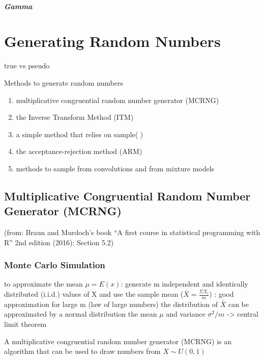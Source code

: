 \documentclass[
  letterpaper,
  DIV=11,
  numbers=noendperiod]{scrreprt}
\providecommand{\tightlist}{%
  \setlength{\itemsep}{0pt}\setlength{\parskip}{0pt}}\usepackage{longtable,booktabs,array}
\begin{document}
\subsubsection{Gamma}\label{gamma}

\part{Generating Random Numbers}

true vs pseudo

Methods to generate random numbers

\begin{enumerate}
\def\labelenumi{\arabic{enumi}.}
\tightlist
\item
  multiplicative congruential random number generator (MCRNG)
\item
  the Inverse Transform Method (ITM)
\item
  a simple method that relies on sample( )
\item
  the acceptance-rejection method (ARM)
\item
  methods to sample from convolutions and from mixture models
\end{enumerate}

\chapter{Multiplicative Congruential Random Number Generator
(MCRNG)}\label{multiplicative-congruential-random-number-generator-mcrng}

(from: Braun and Murdoch's book ``A first course in statistical
programming with R'' 2nd edition (2016): Section 5.2)

\section{Monte Carlo Simulation}\label{monte-carlo-simulation}

to approximate the mean \(\mu = E(x)\): generate m independent and
identically distributed (i.i.d.) values of X and use the sample mean
(\(\bar{X} = \frac{\Sigma X_i}{m}\)) : good approximation for large m
(law of large numbers) the distribution of \(\bar{X}\) can be
approximated by a normal distribution the mean \(\mu\) and variance
\(\sigma ^2 /m\) -\textgreater{} central limit theorem

A multiplicative congruential random number generator (MCRNG) is an
algorithm that can be used to draw numbers from \(X \sim U(0, 1)\)
\end{document}
